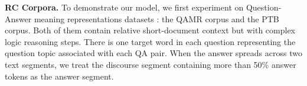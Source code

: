 \textbf{RC Corpora.}
To demonstrate our model, we first experiment on Question-Answer meaning representations datasets \cite{DBLP:conf/naacl/MichaelSHDZ18}: the QAMR corpus and the PTB corpus. Both of them contain relative short-document context but with complex logic reasoning steps. 
There is one target word in each question representing the question topic associated with each QA pair. %
When the answer spreads across two text segments, we treat the discourse segment containing more than 50\% answer tokens as the answer segment.

